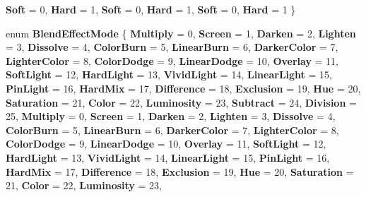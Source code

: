 \begin{DoxyCompactItemize}
\newline
{\bfseries Soft} = 0, 
{\bfseries Hard} = 1, 
{\bfseries Soft} = 0, 
{\bfseries Hard} = 1, 
\newline
{\bfseries Soft} = 0, 
{\bfseries Hard} = 1
 \}
\item 
\mbox{\label{namespace_microsoft_1_1_graphics_1_1_canvas_1_1_effects_a2cba8d6181059b5f496c6734b739752e}} 
enum {\bfseries Blend\+Effect\+Mode} \{ \newline
{\bfseries Multiply} = 0, 
{\bfseries Screen} = 1, 
{\bfseries Darken} = 2, 
{\bfseries Lighten} = 3, 
\newline
{\bfseries Dissolve} = 4, 
{\bfseries Color\+Burn} = 5, 
{\bfseries Linear\+Burn} = 6, 
{\bfseries Darker\+Color} = 7, 
\newline
{\bfseries Lighter\+Color} = 8, 
{\bfseries Color\+Dodge} = 9, 
{\bfseries Linear\+Dodge} = 10, 
{\bfseries Overlay} = 11, 
\newline
{\bfseries Soft\+Light} = 12, 
{\bfseries Hard\+Light} = 13, 
{\bfseries Vivid\+Light} = 14, 
{\bfseries Linear\+Light} = 15, 
\newline
{\bfseries Pin\+Light} = 16, 
{\bfseries Hard\+Mix} = 17, 
{\bfseries Difference} = 18, 
{\bfseries Exclusion} = 19, 
\newline
{\bfseries Hue} = 20, 
{\bfseries Saturation} = 21, 
{\bfseries Color} = 22, 
{\bfseries Luminosity} = 23, 
\newline
{\bfseries Subtract} = 24, 
{\bfseries Division} = 25, 
{\bfseries Multiply} = 0, 
{\bfseries Screen} = 1, 
\newline
{\bfseries Darken} = 2, 
{\bfseries Lighten} = 3, 
{\bfseries Dissolve} = 4, 
{\bfseries Color\+Burn} = 5, 
\newline
{\bfseries Linear\+Burn} = 6, 
{\bfseries Darker\+Color} = 7, 
{\bfseries Lighter\+Color} = 8, 
{\bfseries Color\+Dodge} = 9, 
\newline
{\bfseries Linear\+Dodge} = 10, 
{\bfseries Overlay} = 11, 
{\bfseries Soft\+Light} = 12, 
{\bfseries Hard\+Light} = 13, 
\newline
{\bfseries Vivid\+Light} = 14, 
{\bfseries Linear\+Light} = 15, 
{\bfseries Pin\+Light} = 16, 
{\bfseries Hard\+Mix} = 17, 
\newline
{\bfseries Difference} = 18, 
{\bfseries Exclusion} = 19, 
{\bfseries Hue} = 20, 
{\bfseries Saturation} = 21, 
\newline
{\bfseries Color} = 22, 
{\bfseries Luminosity} = 23, 

\end{DoxyCompactItemize}
